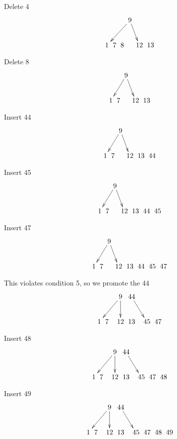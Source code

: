 \documentclass[a4paper]{article}
\begin{document}
Delete 4\\
$$\xymatrix @C=0pt {
& &  & &  & \ar[dlll] 9 \ar[dr] & &   &  &  \\
  &  & 1 & 7 & 8 &  & 12 & 13 &  &  \\
}$$

Delete 8\\
$$\xymatrix @C=0pt {
& &  &   & \ar[dll] 9 \ar[dr] & &   &  &  \\
 &  & 1 & 7 &  & 12 & 13 &  &  \\
}$$

Insert 44\\
$$\xymatrix @C=0pt {
& &  &   & \ar[dll] 9 \ar[dr] & &   &  &  \\
 &  & 1 & 7 &  & 12 & 13 & 44 &  &  \\
}$$

Insert 45\\
$$\xymatrix @C=0pt {
& &  &   & \ar[dll] 9 \ar[dr] & &   &  &  \\
 &  & 1 & 7 &  & 12 & 13 & 44 & 45 &  &  \\
}$$

Insert 47\\
$$\xymatrix @C=0pt {
& &  &   & \ar[dll] 9 \ar[dr] & &   &  &  \\
 &  & 1 & 7 &  & 12 & 13 & 44 & 45 & 47 &  &  \\
}$$

This violates condition 5, so we promote the 44\\
$$\xymatrix @C=0pt {
& &  &   &   & \ar[dlll] 9\ar[d]&44\ar[drr] &   &  &  \\
 &  & 1 & 7 &  & 12 & 13 &  & 45 & 47 &  &  \\
}$$

Insert 48\\
$$\xymatrix @C=0pt {
& &  &   &   & \ar[dlll] 9\ar[d]&44\ar[drr] &   &  &  \\
 &  & 1 & 7 &  & 12 & 13 &  & 45 & 47 & 48 &  &  \\
}$$

Insert 49\\
$$\xymatrix @C=0pt {
& &  &   &   & \ar[dlll] 9\ar[d]&44\ar[drr] &   &  &  \\
 &  & 1 & 7 &  & 12 & 13 &  & 45 & 47 & 48 & 49 &  &  \\
}$$
\end{document}
